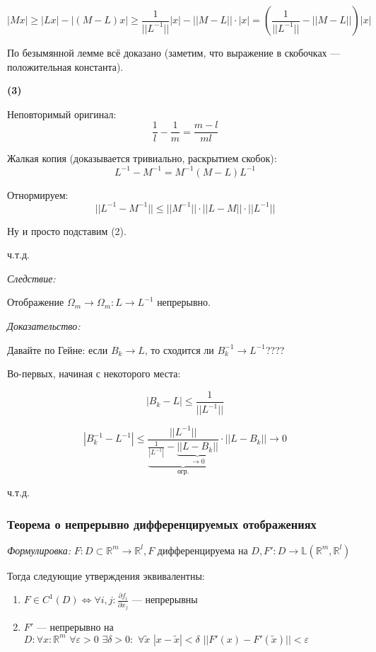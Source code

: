 \documentclass{article}
\def\dbl{\,\,}
\begin{document}
\[|Mx| \ge |Lx| - |(M - L)x| \ge \frac{1}{||L^{-1}||}|x| - ||M - L||\cdot|x| = \left(\frac{1}{||L^{-1}||} - ||M - L||\right)|x|\]

По безымянной лемме всё доказано (заметим, что выражение в скобочках --- положительная константа).

\textbf{(3)}

Неповторимый оригинал:
\[\frac{1}{l} - \frac{1}{m} = \frac{m - l}{ml}\]

Жалкая копия (доказывается тривиально, раскрытием скобок):
\[L^{-1}  - M^{-1} = M^{-1}(M - L)L^{-1}\]

Отнормируем:
\[||L^{-1} - M^{-1}|| \le ||M^{-1}|| \cdot ||L - M|| \cdot ||L^{-1}||\]

Ну и просто подставим (2).

ч.т.д.

\textit{Следствие:}

Отображение $\Omega_m \rightarrow \Omega_m: L \rightarrow L^{-1}$ непрерывно.

\textit{Доказательство:}

Давайте по Гейне: если $B_k \rightarrow L$, то сходится ли $B^{-1}_k \rightarrow L^{-1}$????

Во-первых, начиная с некоторого места:

\[|B_k - L| \le \frac{1}{||L^{-1}||}\]

\[|B^{-1}_k - L^{-1}| \le \frac{||L^{-1}||}{\underbrace{\frac{1}{|L^{-1}|} - \underbrace{||L - B_k||}_{\rightarrow 0}}_{\text{огр.}}} \cdot ||L - B_k|| \rightarrow 0\]

ч.т.д.


\subsubsection{Теорема о непрерывно дифференцируемых отображениях}
\textit{Формулировка:}
$F: D \subset \mathbb{R}^m \rightarrow \mathbb{R}^l, F$ дифференцируема на $D, F': D \rightarrow \mathbb{L}(\mathbb{R}^m, \mathbb{R}^l)$

Тогда следующие утверждения эквивалентны:

\begin{enumerate}
    \item $F \in C^1(D) \Leftrightarrow \forall i, j: \frac{\partial f_i}{\partial x_j}$ --- непрерывны
    \item $F'$ --- непрерывно на $D: \forall x: \mathbb{R}^m \dbl \forall \varepsilon > 0 \dbl \exists \delta > 0: \dbl \forall \widetilde{x} \dbl |x - \widetilde{x}| < \delta \dbl ||F'(x) - F'(\widetilde{x})|| < \varepsilon$
\end{enumerate}
\end{document}
